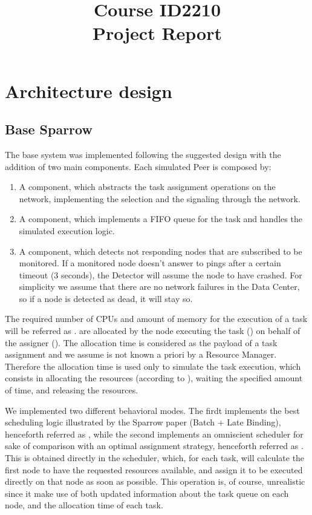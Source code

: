\documentclass[conference]{IEEEtran}
\title{
  Course ID2210\\
  Project Report
}
\author{
  \IEEEauthorblockN{Riccardo Reale}
  \IEEEauthorblockA{Peerialism AB\\
    {riccardo.reale@peerialism.com}\\
    \url{https://github.com/riccardoreale/id2210-vt14.git}
  }
  \and
  \IEEEauthorblockN{Giovanni Simoni}
  \IEEEauthorblockA{Peerialism AB\\
    {giovanni.simoni@peerialism.com}\\
    \url{https://github.com/dacav/id2210-vt14.git}
  }
}
\begin{document}
\maketitle

\section{Architecture design}

  \subsection{Base Sparrow}

  The base system was implemented following the suggested design with the
  addition of two main components. Each simulated Peer is composed by:
  \begin{enumerate}

  \item A \ResourceManager component, which abstracts the task assignment
    operations on the network, implementing the selection and the
    signaling through the network.

  \item A \RmWorker component, which implements a FIFO queue for the task and
    handles the simulated execution logic.

  \item A \FailureDetector component, which detects not
    responding nodes that are subscribed to be monitored. If a monitored
    node doesn't answer to pings after a certain timeout (3 seconds),
    the Detector will assume the node to have crashed. For simplicity we
    assume that there are no network failures in the Data Center, so if a
    node is detected as dead, it will stay so.

  \end{enumerate}

  The required number of CPUs and amount of memory for the execution of a
  task will be referred as \treq. \Treq are allocated by the node
  executing the task (\exc) on behalf of the assigner (\tmast). The
  allocation time is considered as the payload of a task assignment and
  we assume is not known a priori by a Resource Manager. Therefore the
  allocation time is used only to simulate the task execution, which
  consists in allocating the resources (according to \treq), waiting the
  specified amount of time, and releasing the resources.

  We implemented two different behavioral modes. The firdt implements the
  best scheduling logic illustrated by the Sparrow paper (Batch + Late
  Binding), henceforth referred as \us, while the second implements an
  omniscient scheduler for sake of comparison with an optimal assignment
  strategy, henceforth referred as \omni. This is obtained directly in the
  \dc scheduler, which, for each task, will calculate the first
  node to have the requested resources available, and assign it to be
  executed directly on that node as soon as possible. This operation is,
  of course, unrealistic since it make use of both updated information
  about the task queue on each node, and the allocation time of each task.
\end{document}
